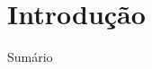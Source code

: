 \documentclass{beamer}
\subtitle{Parte 1: O básico}
\begin{document}
\begin{frame}
\titlepage
\end{frame}

\section{Introdução}

\begin{frame}{Sumário}
\begin{multicols}{2}
\tableofcontents[currentsection]
\end{multicols}
\end{frame}

\end{document}
